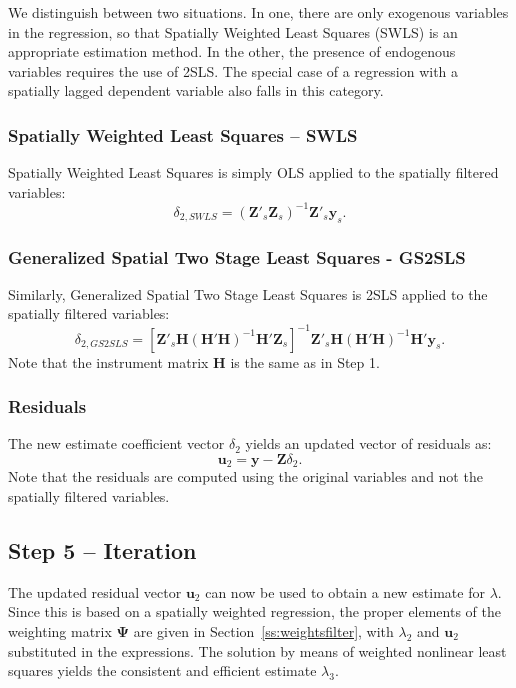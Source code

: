 \documentclass{article}
\begin{document}
We distinguish between two situations. In one, there are only exogenous
variables in the regression, so that Spatially Weighted Least Squares (SWLS) is
an appropriate estimation method. In the other, the presence of endogenous
variables requires the use of 2SLS. The special case of a regression with a
spatially lagged dependent variable also falls in this category.

\subsubsection{Spatially Weighted Least Squares -- SWLS}
Spatially Weighted Least Squares is simply OLS applied to the spatially filtered
variables:
\begin{equation}\label{eq:swls}
\delta_{2,SWLS} = ( \mathbf{Z'}_s \mathbf{Z}_s )^{-1} \mathbf{Z'}_s \mathbf{y}_s.
\end{equation}

\subsubsection{Generalized Spatial Two Stage Least Squares - GS2SLS}
Similarly, Generalized Spatial Two Stage Least Squares is 2SLS applied to the
spatially filtered variables:
\begin{equation}\label{eq:gs2sls}
\delta_{2,GS2SLS} = [ \mathbf{Z'}_s \mathbf{H} (\mathbf{H'H})^{-1} \mathbf{H'} \mathbf{Z}_s ]^{-1} \mathbf{Z'}_s \mathbf{H} (\mathbf{H'H})^{-1} \mathbf{H'} \mathbf{y}_s.
\end{equation}
Note that the instrument matrix $\mathbf{H}$ is the same as in Step 1.

\subsubsection{Residuals}
The new estimate coefficient vector $\delta_2$ yields an updated vector of residuals as:
\begin{equation*}
\mathbf{u}_2 = \mathbf{y} - \mathbf{Z} \delta_2.
\end{equation*}
Note that the residuals are computed using the original variables and not the spatially
filtered variables.

\subsection{Step 5 -- Iteration}
The updated residual vector $\mathbf{u}_2$ can now be used to obtain a new
estimate for $\lambda$. Since this is based on a spatially weighted regression,
the proper elements of the weighting matrix $\mathbf{\Psi}$ are given in 
Section~\ref{ss:weightsfilter}, with $\lambda_2$ and $\mathbf{u}_2$ substituted
in the expressions. The solution by means of weighted nonlinear least squares yields
the consistent and efficient estimate $\lambda_3$.
\end{document}
